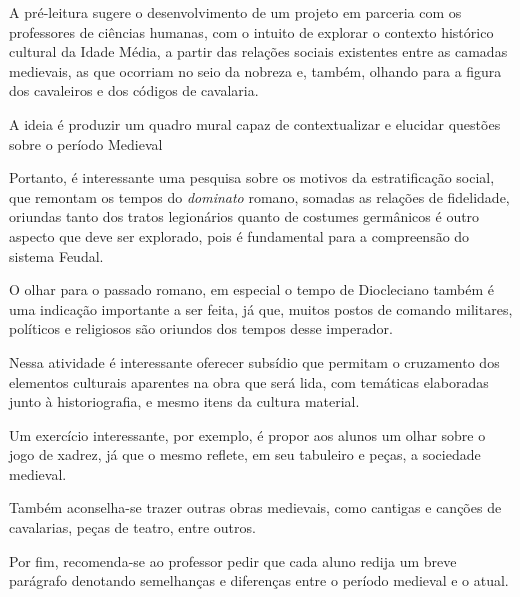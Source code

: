 \documentclass[12pt]{extarticle}
\begin{document}
A pré-leitura sugere o desenvolvimento de um projeto em
parceria com os professores de ciências humanas, com o intuito de
explorar o contexto histórico cultural da Idade Média, a partir das
relações sociais existentes entre as camadas medievais, as que ocorriam
no seio da nobreza e, também, olhando para a figura dos cavaleiros e dos
códigos de cavalaria.

A ideia é produzir um quadro mural capaz de contextualizar e elucidar
questões sobre o período Medieval

Portanto, é interessante uma pesquisa sobre os motivos da estratificação
social, que remontam os tempos do \emph{dominato} romano, somadas as
relações de fidelidade, oriundas tanto dos tratos legionários quanto de
costumes germânicos é outro aspecto que deve ser explorado, pois é
fundamental para a compreensão do sistema Feudal.

O olhar para o passado romano, em especial o tempo de Diocleciano também
é uma indicação importante a ser feita, já que, muitos postos de comando
militares, políticos e religiosos são oriundos dos tempos desse
imperador.

Nessa atividade é interessante oferecer subsídio que permitam o
cruzamento dos elementos culturais aparentes na obra que será lida, com
temáticas elaboradas junto à historiografia, e mesmo itens da cultura
material.

Um exercício interessante, por exemplo, é propor aos alunos um olhar
sobre o jogo de xadrez, já que o mesmo reflete, em seu tabuleiro e
peças, a sociedade medieval.

Também aconselha-se trazer outras obras medievais, como cantigas e
canções de cavalarias, peças de teatro, entre outros.

Por fim, recomenda-se ao professor pedir que cada aluno redija um breve
parágrafo denotando semelhanças e diferenças entre o período medieval e
o atual.
\end{document}
